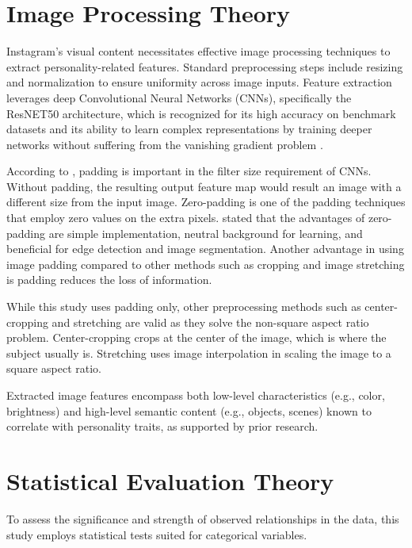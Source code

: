 \section{Image Processing Theory}

Instagram's visual content necessitates effective image processing techniques to extract personality-related features. Standard preprocessing steps include resizing and normalization to ensure uniformity across image inputs. Feature extraction leverages deep Convolutional Neural Networks (CNNs), specifically the ResNET50 architecture, which is recognized for its high accuracy on benchmark datasets and its ability to learn complex representations by training deeper networks without suffering from the vanishing gradient problem \citep{he2015}.

According to \citet{Almodawar_Ahmad_Alqahtani_2025}, padding is important in the filter size requirement of CNNs. Without padding, the resulting output feature map would result an image with a different size from the input image. Zero-padding is one of the padding techniques that employ zero values on the extra pixels. \citet{Almodawar_Ahmad_Alqahtani_2025} stated that the advantages of zero-padding are simple implementation, neutral background for learning, and beneficial for edge detection and image segmentation. Another advantage in using image padding compared to other methods such as cropping and image stretching is padding reduces the loss of information. 

While this study uses padding only, other preprocessing methods such as center-cropping and stretching are valid as they solve the non-square aspect ratio problem. Center-cropping crops at the center of the image, which is where the subject usually is. Stretching uses image interpolation in scaling the image to a square aspect ratio.

Extracted image features encompass both low-level characteristics (e.g., color, brightness) and high-level semantic content (e.g., objects, scenes) known to correlate with personality traits, as supported by prior research.

\section{Statistical Evaluation Theory}
To assess the significance and strength of observed relationships in the data, this study employs statistical tests suited for categorical variables.

